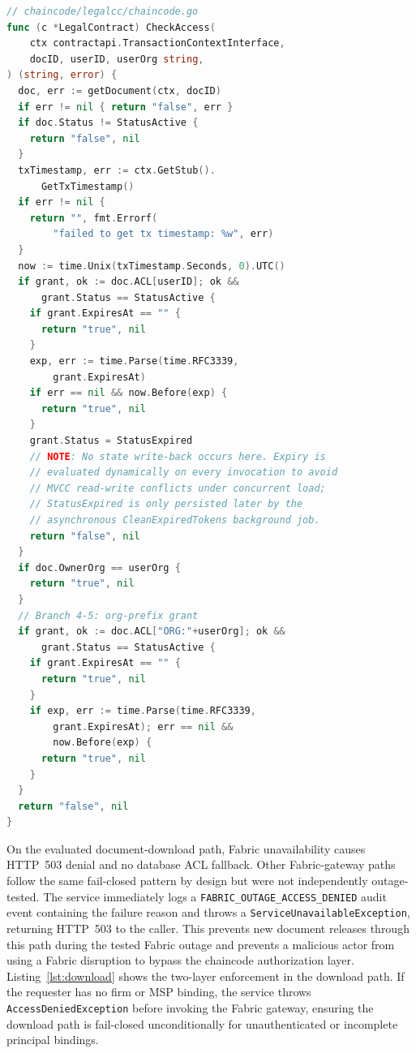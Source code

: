 \documentclass{ieeeaccess}
\begin{document}
\begin{lstlisting}[language=Go,
    float=!t,
    caption={\texttt{CheckAccess} chaincode enforcing time-bounded
capability tokens (see Section~\ref{sec:acl} for the eventual-consistency
model). All five access branches shown: per-user grants (Branches~1--2),
owner-organization fallback (Branch~3), and org-prefix grants
(Branches~4--5).},
    label=lst:checkaccess]
// chaincode/legalcc/chaincode.go
func (c *LegalContract) CheckAccess(
    ctx contractapi.TransactionContextInterface,
    docID, userID, userOrg string,
) (string, error) {
  doc, err := getDocument(ctx, docID)
  if err != nil { return "false", err }
  if doc.Status != StatusActive {
    return "false", nil
  }
  txTimestamp, err := ctx.GetStub().
      GetTxTimestamp()
  if err != nil {
    return "", fmt.Errorf(
        "failed to get tx timestamp: %w", err)
  }
  now := time.Unix(txTimestamp.Seconds, 0).UTC()
  if grant, ok := doc.ACL[userID]; ok &&
      grant.Status == StatusActive {
    if grant.ExpiresAt == "" {
      return "true", nil
    }
    exp, err := time.Parse(time.RFC3339,
        grant.ExpiresAt)
    if err == nil && now.Before(exp) {
      return "true", nil
    }
    grant.Status = StatusExpired
    // NOTE: No state write-back occurs here. Expiry is
    // evaluated dynamically on every invocation to avoid
    // MVCC read-write conflicts under concurrent load;
    // StatusExpired is only persisted later by the
    // asynchronous CleanExpiredTokens background job.
    return "false", nil
  }
  if doc.OwnerOrg == userOrg {
    return "true", nil
  }
  // Branch 4-5: org-prefix grant
  if grant, ok := doc.ACL["ORG:"+userOrg]; ok &&
      grant.Status == StatusActive {
    if grant.ExpiresAt == "" {
      return "true", nil
    }
    if exp, err := time.Parse(time.RFC3339,
        grant.ExpiresAt); err == nil &&
        now.Before(exp) {
      return "true", nil
    }
  }
  return "false", nil
}
\end{lstlisting}

On the evaluated document-download path, Fabric unavailability causes
HTTP~503 denial and no database ACL fallback. Other Fabric-gateway paths
follow the same fail-closed pattern by design but were not independently
outage-tested. The service immediately logs a
\texttt{FABRIC\_OUTAGE\_ACCESS\_DENIED} audit event containing the
failure reason and throws a \texttt{ServiceUnavailableException},
returning HTTP~503 to the caller. This prevents new document releases
through this path during the tested Fabric outage and prevents a malicious
actor from using a Fabric disruption to bypass the chaincode authorization
layer. Listing~\ref{lst:download} shows the two-layer
enforcement in the download path. If the requester has no firm or MSP binding,
the service throws \texttt{AccessDeniedException} before invoking the
Fabric gateway, ensuring the download path is fail-closed
unconditionally for unauthenticated or incomplete principal bindings.
\end{document}
